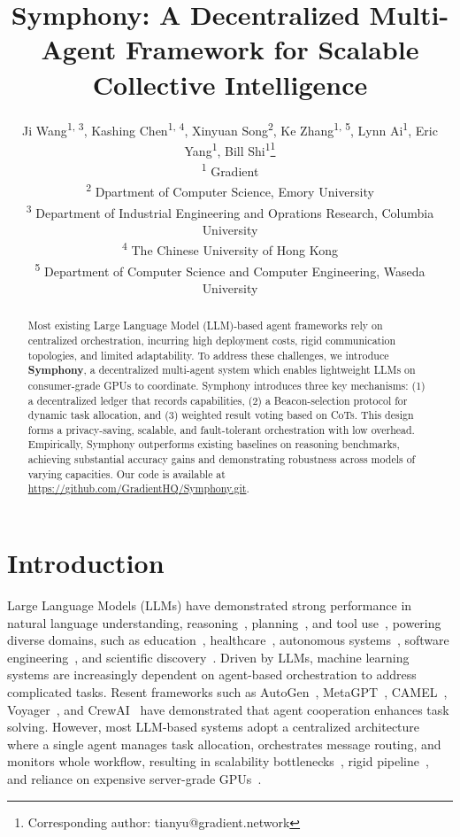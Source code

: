 \documentclass{article}
\title{Symphony: A Decentralized Multi-Agent Framework for Scalable Collective Intelligence}
\author{
  Ji Wang\textsuperscript{1, 3},
  Kashing Chen\textsuperscript{1, 4},
  Xinyuan Song\textsuperscript{2},
  Ke Zhang\textsuperscript{1, 5},
  Lynn Ai\textsuperscript{1},
  Eric Yang\textsuperscript{1},
  Bill Shi\textsuperscript{1}\thanks{Corresponding author: tianyu@gradient.network} \\
  \textsuperscript{1} Gradient \\
  \textsuperscript{2} Dpartment of Computer Science, Emory University \\
  \textsuperscript{3} Department of Industrial Engineering and Oprations Research, Columbia University \\
  \textsuperscript{4} The Chinese University of Hong Kong \\
  \textsuperscript{5} Department of Computer Science and Computer Engineering, Waseda University \\
}
\begin{document}
\maketitle

\begin{abstract}

Most existing Large Language Model (LLM)-based agent frameworks rely on centralized orchestration, incurring high deployment costs, rigid communication topologies, and limited adaptability. To address these challenges, we introduce \textbf{Symphony}, a decentralized multi-agent system which enables lightweight LLMs on consumer-grade GPUs to coordinate. Symphony introduces three key mechanisms: (1) a decentralized ledger that records capabilities, (2) a Beacon-selection protocol for dynamic task allocation, and (3) weighted result voting based on CoTs. This design forms a privacy-saving, scalable, and fault-tolerant orchestration with low overhead. Empirically, Symphony outperforms existing baselines on reasoning benchmarks, achieving substantial accuracy gains and demonstrating robustness across models of varying capacities. Our code is available at \url{https://github.com/GradientHQ/Symphony.git}.
\end{abstract}

\section{Introduction}

Large Language Models (LLMs) have demonstrated strong performance in natural language understanding, reasoning~\cite{zhu20254th}, planning~\cite{zhang2025ccma}, and tool use~\cite{toubal2024modeling}, powering diverse domains, such as education~\cite{zhang2024simulating}, healthcare~\cite{chu2023age}, autonomous systems~\cite{yang2024wcdt}, software engineering~\cite{hou2023large}, and scientific discovery~\cite{wang2023sample}. Driven by LLMs, machine learning systems are increasingly dependent on agent-based orchestration to address complicated tasks. Resent frameworks such as AutoGen~\cite{wu2023autogen}, MetaGPT~\cite{metagpt2023}, CAMEL~\cite{camel2023}, Voyager~\cite{wang2023voyager}, and CrewAI~\cite{crewai} have demonstrated that agent cooperation enhances task solving. However, most LLM-based systems adopt a centralized architecture where a single agent manages task allocation, orchestrates message routing, and monitors whole workflow, resulting in scalability bottlenecks~\cite{aratchige2025llms}, rigid pipeline~\cite{torantine2023autogpt,narvekar2020curriculum}, and reliance on expensive server-grade GPUs~\cite{guo2024large}.
\end{document}
